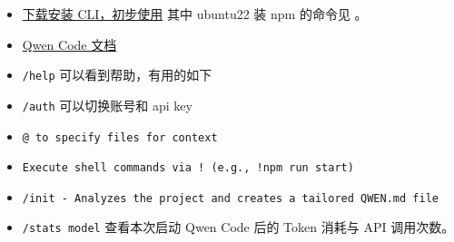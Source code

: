 
\begin{itemize}
\item \href{https://help.aliyun.com/zh/model-studio/qwen-code#bfe3dff25ecxb}{下载安装 CLI，初步使用} 其中 ubuntu22 装 npm 的命令见 。
\item \href{https://qwenlm.github.io/qwen-code-docs/zh/}{Qwen Code 文档}
\item \verb`/help` 可以看到帮助，有用的如下
\item \verb`/auth` 可以切换账号和 api key
\item \verb`@ to specify files for context`
\item \verb`Execute shell commands via ! (e.g., !npm run start)`
\item \verb`/init - Analyzes the project and creates a tailored QWEN.md file`
\item \verb`/stats model` 查看本次启动 Qwen Code 后的 Token 消耗与 API 调用次数。
\end{itemize}

